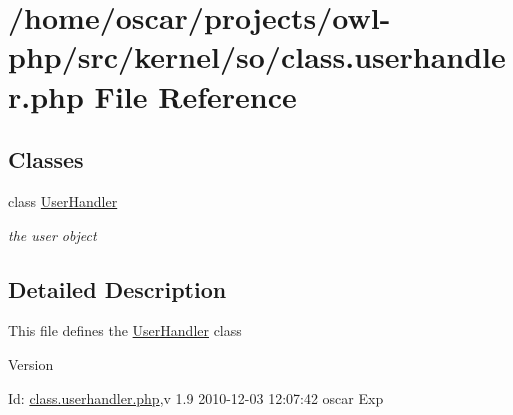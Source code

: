 \section{/home/oscar/projects/owl-\/php/src/kernel/so/class.userhandler.php File Reference}
\label{class_8userhandler_8php}
\subsection*{Classes}
\begin{DoxyCompactItemize}
\item 
class \hyperlink{classUserHandler}{UserHandler}
\begin{DoxyCompactList}\small\item\em the user object \item\end{DoxyCompactList}\end{DoxyCompactItemize}


\subsection{Detailed Description}
This file defines the \hyperlink{classUserHandler}{UserHandler} class \begin{DoxyVersion}{Version}

\end{DoxyVersion}
\begin{DoxyParagraph}{Id:}
\hyperlink{class_8userhandler_8php}{class.userhandler.php},v 1.9 2010-\/12-\/03 12:07:42 oscar Exp 
\end{DoxyParagraph}
